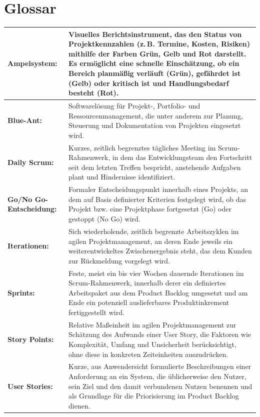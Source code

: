 \documentclass[
    12pt, 
    a4paper,
    ]{scrartcl} %
\begin{document}
\section*{Glossar}  
{} 
\vspace{0.6cm}
\begin{tabular}{p{4cm} p{11.35cm}}   
    \textbf{\normalsize Ampelsystem:} & \normalsize Visuelles Berichtsinstrument, das den Status von Projektkennzahlen (z.\,B. Termine, Kosten, Risiken) mithilfe der Farben Grün, Gelb und Rot darstellt. Es ermöglicht eine schnelle Einschätzung, ob ein Bereich planmäßig verläuft (Grün), gefährdet ist (Gelb) oder kritisch ist und Handlungsbedarf besteht (Rot).\\[0.5cm]
    \hline
    \textbf{\normalsize Blue-Ant:} & \normalsize Softwarelösung für Projekt-, Portfolio- und Ressourcenmanagement, die unter anderem zur Planung, Steuerung und Dokumentation von Projekten eingesetzt wird.\\[0.5cm]
    \hline
    \textbf{\normalsize Daily Scrum:} & \normalsize Kurzes, zeitlich begrenztes tägliches Meeting im Scrum-Rahmenwerk, in dem das Entwicklungsteam den Fortschritt seit dem letzten Treffen bespricht, anstehende Aufgaben plant und Hindernisse identifiziert.\\[0.5cm]
    \hline
    \textbf{\normalsize Go/No Go-Entscheidung:} & \normalsize Formaler Entscheidungspunkt innerhalb eines Projekts, an dem auf Basis definierter Kriterien festgelegt wird, ob das Projekt bzw. eine Projektphase fortgesetzt (Go) oder gestoppt (No Go) wird.\\[0.5cm]
    \hline
    \textbf{\normalsize Iterationen:} & \normalsize Sich wiederholende, zeitlich begrenzte Arbeitszyklen im agilen Projektmanagement, an deren Ende jeweils ein weiterentwickeltes Zwischenergebnis steht, das dem Kunden zur Rückmeldung vorgelegt wird.\\[0.5cm]
    \hline
    \textbf{\normalsize Sprints:} & \normalsize Feste, meist ein bis vier Wochen dauernde Iterationen im Scrum-Rahmenwerk, innerhalb derer ein definiertes Arbeitspaket aus dem Product Backlog umgesetzt und am Ende ein potenziell auslieferbares Produktinkrement fertiggestellt wird.\\[0.5cm]
    \hline
    \textbf{\normalsize Story Points:} & \normalsize Relative Maßeinheit im agilen Projektmanagement zur Schätzung des Aufwands einer User Story, die Faktoren wie Komplexität, Umfang und Unsicherheit berücksichtigt, ohne diese in konkreten Zeiteinheiten auszudrücken.\\[0.5cm]
    \hline
    \textbf{\normalsize User Stories:} & \normalsize Kurze, aus Anwendersicht formulierte Beschreibungen einer Anforderung an ein System, die üblicherweise den Nutzer, sein Ziel und den damit verbundenen Nutzen benennen und als Grundlage für die Priorisierung im Product Backlog dienen.\\[0.5cm]
\end{tabular}
\end{document}
